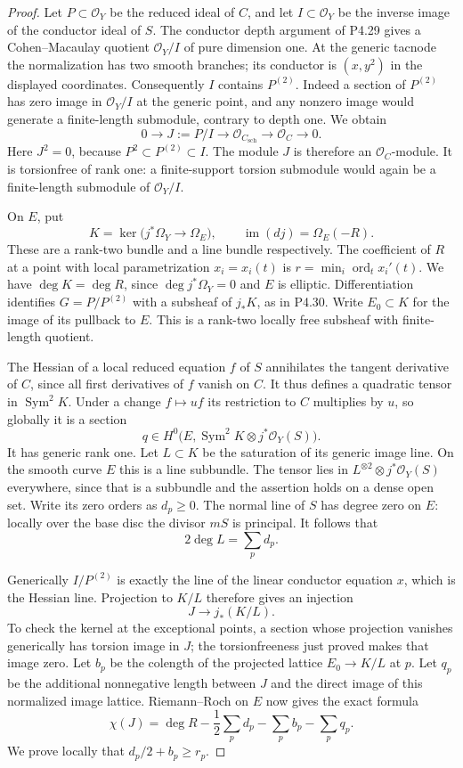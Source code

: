 \begin{proof}
Let $P\subset\mathcal O_Y$ be the reduced ideal of $C$, and let
$I\subset\mathcal O_Y$ be the inverse image of the conductor ideal
of $S$. The conductor depth argument of P4.29 gives a
Cohen--Macaulay quotient $\mathcal O_Y/I$ of pure dimension one.
At the generic tacnode the normalization has two smooth branches;
its conductor is $(x,y^2)$ in the displayed coordinates.
Consequently $I$ contains $P^{(2)}$. Indeed a section of $P^{(2)}$
has zero image in $\mathcal O_Y/I$ at the generic point, and any
nonzero image would generate a finite-length submodule, contrary
to depth one. We obtain
\[
 0\longrightarrow J:=P/I\longrightarrow
 \mathcal O_{C_{\mathrm{sch}}}\longrightarrow\mathcal O_C
 \longrightarrow0.
\]
Here $J^2=0$, because $P^2\subset P^{(2)}\subset I$.
The module $J$ is therefore an $\mathcal O_C$-module. It is
torsionfree of rank one: a finite-support torsion submodule would
again be a finite-length submodule of $\mathcal O_Y/I$.

On $E$, put
\[
 K=\ker\bigl(j^*\Omega_Y\longrightarrow\Omega_E\bigr),
 \qquad\operatorname{im}(dj)=\Omega_E(-R).
\]
These are a rank-two bundle and a line bundle respectively.
The coefficient of $R$ at a point with local parametrization
$x_i=x_i(t)$ is $r=\min_i\operatorname{ord}_t x_i'(t)$.
We have $\deg K=\deg R$, since $\deg j^*\Omega_Y=0$
and $E$ is elliptic. Differentiation identifies
$G=P/P^{(2)}$ with a subsheaf of $j_*K$, as in P4.30.
Write $E_0\subset K$ for the image of its pullback to $E$.
This is a rank-two locally free subsheaf with finite-length
quotient.

The Hessian of a local reduced equation $f$ of $S$ annihilates
the tangent derivative of $C$, since all first derivatives of
$f$ vanish on $C$. It thus defines a quadratic tensor in
$\operatorname{Sym}^2K$. Under a change $f\mapsto u f$ its
restriction to $C$ multiplies by $u$, so globally it is a section
\[
 q\in H^0\bigl(E,\operatorname{Sym}^2K\otimes j^*\mathcal O_Y(S)\bigr).
\]
It has generic rank one. Let $L\subset K$ be the saturation of
its generic image line. On the smooth curve $E$ this is a line
subbundle. The tensor lies in $L^{\otimes2}\otimes
j^*\mathcal O_Y(S)$ everywhere, since that is a subbundle and
the assertion holds on a dense open set. Write its zero orders
as $d_p\geq0$. The normal line of $S$ has degree zero on $E$:
locally over the base disc the divisor $mS$ is principal.
It follows that
\[
 2\deg L=\sum_p d_p.
\]

Generically $I/P^{(2)}$ is exactly the line of the linear
conductor equation $x$, which is the Hessian line. Projection
to $K/L$ therefore gives an injection
\[
 J\longrightarrow j_*(K/L).
\]
To check the kernel at the exceptional points, a section whose
projection vanishes generically has torsion image in $J$; the
torsionfreeness just proved makes that image zero. Let $b_p$ be
the colength of the projected lattice $E_0\to K/L$ at $p$.
Let $q_p$ be the additional nonnegative length between $J$ and
the direct image of this normalized image lattice. Riemann--Roch
on $E$ now gives the exact formula
\[
 \chi(J)=\deg R-\frac12\sum_p d_p-\sum_p b_p-\sum_p q_p.
\]
We prove locally that $d_p/2+b_p\geq r_p$.


\end{proof}
